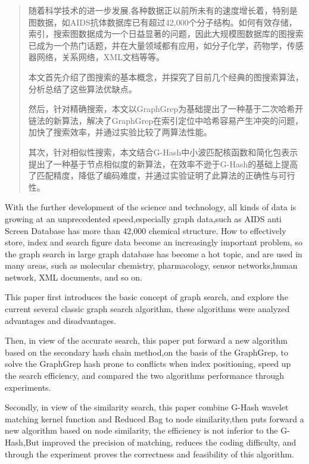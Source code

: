 \documentclass{XDBAthesis}
\begin{document}
\else
\fi
\begin{abstract}
    随着科学技术的进一步发展,各种数据正以前所未有的速度增长着，特别是图数据，如AIDS抗体数据库已有超过42,000个分子结构。如何有效存储，索引，搜索图数据成为一个日益显著的问题，因此大规模图数据库的图搜索已成为一个热门话题，并在大量领域都有应用，如分子化学，药物学，传感器网络，关系网络，XML文档等等。
    
    本文首先介绍了图搜索的基本概念，并探究了目前几个经典的图搜索算法，分析总结了这些算法优缺点。
    
    然后，针对精确搜索，本文以GraphGrep为基础提出了一种基于二次哈希开链法的新算法，解决了GraphGrep在索引定位中哈希容易产生冲突的问题，加快了搜索效率，并通过实验比较了两算法性能。
    
    其次，针对相似性搜索，本文结合G-Hash中小波匹配核函数和简化包表示提出了一种基于节点相似度的新算法，在效率不逊于G-Hash的基础上提高了匹配精度，降低了编码难度，并通过实验证明了此算法的正确性与可行性。
    
    
\end{abstract}
\begin{englishabstract}
With the further development of the science and technology, all kinds of data is growing at an unprecedented speed,especially graph data,such as AIDS anti Screen Database has more than 42,000 chemical structure.  How to effectively store, index and search figure data become an increasingly important problem, so the graph search in large graph database has become a hot topic, and are used in many areas, such as molecular chemistry, pharmacology, sensor networks,human network, XML documents, and so on.

This paper first introduces the basic concept of graph search, and explore the current several classic graph search algorithm, these algorithms were analyzed advantages and disadvantages.

Then, in view of the accurate search, this paper put forward a new algorithm based on the secondary hash chain method,on the basis of the GraphGrep, to solve the GraphGrep hash prone to conflicts when index positioning, speed up the search efficiency, and compared the two algorithms performance through experiments.

Secondly, in view of the similarity search, this paper combine G-Hash wavelet matching kernel function and Reduced Bag to node similarity,then puts forward a new algorithm based on node similarity, the efficiency is not inferior to the G-Hash,But improved the precision of matching, reduces the coding difficulty, and through the experiment proves the correctness and feasibility of this algorithm.

\end{englishabstract}



\ifx\allfiles\undefined
%
%
\end{document}
